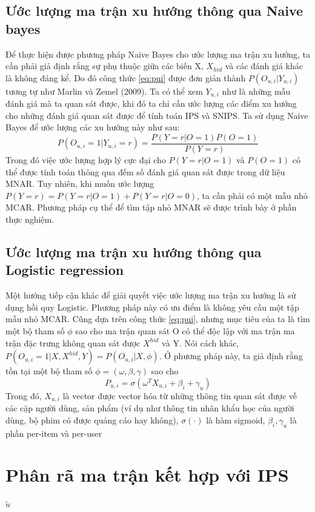 \subsection{Ước lượng ma trận xu hướng thông qua Naive bayes}

Để thực hiện được phương pháp Naive Bayes cho ước lượng ma trận xu hướng, ta cần phải giả định rắng sự phụ thuộc giữa các biến X,   $X_{hid}$ và các đánh giá khác là không đáng kể. Do đó công thức \ref{eq:pui} được đơn giản thành $P(O_{u,i}|Y_{u,i})$ tương tự như Marlin và Zemel (2009). Ta có thể xem $Y_{u,i}$ như là những mẫu đánh giá mà ta quan sát được, khi đó ta chỉ cần ước lượng các điểm xu hướng cho những đánh giá quan sát được để tính toán IPS và SNIPS. Ta sử dụng Naive Bayes để ước lượng các xu hướng này như sau:
\begin{equation}
\label{eq:pnb}
    P(O_{u,i} = 1| Y_{u,i} = r) = \frac{P(Y=r|O=1)P(O=1)}{P(Y=r)}
\end{equation}
Trong đó việc ước lượng hợp lý cực đại cho $P(Y=r|O=1)$ và $P(O=1)$ có thể được tính toán thông qua đếm số đánh giá  quan sát được trong dữ liệu MNAR. Tuy nhiên, khi muốn ước lượng $P(Y=r) = P(Y=r|O=1) + P(Y=r|O=0)$, ta cần phải có một mẫu nhỏ MCAR. Phương pháp cụ thể để tìm tập nhỏ MNAR sẽ được trình bày ở phần thực nghiệm.  

\subsection{Ước lượng ma trận xu hướng thông qua Logistic regression}
Một hướng tiếp cận khác để giải quyết việc  ước lượng ma trận xu hướng là sử dụng hồi quy Logistic. Phương pháp này có ưu điểm là không yêu cầu một tập mẫu nhỏ MCAR. Cũng dựa trên công thức \ref{eq:pui}, nhưng mục tiêu của ta là tìm một bộ tham số $\phi$ sao cho ma trận quan sát O có thể độc lập với ma trận ma
trận đặc trưng không quan sát được $X^{hid}$ và Y. Nói cách khác, $P(O_{u,i} = 1|X, X^{hid},Y) = P(O_{u,i}|X,\phi)$. Ở phương pháp này, ta giả định rằng tồn tại một bộ tham số $\phi=(\omega, \beta, \gamma)$ sao cho
\begin{equation}
    \label{eq:plr}
    P_{u,i} = \sigma(\omega^TX_{u,i} + \beta_i + \gamma_u)
\end{equation}
Trong đó, $X_{u,i}$ là vector được vector hóa từ những thông tin quan sát được về các cặp người dùng, sản phẩm (ví dụ như thông tin nhân khẩu học của người dùng, bộ phim có được quảng cáo hay không), $\sigma(\cdot)$ là hàm sigmoid, $\beta_i, \gamma_u$ là phần per-item và per-user

\section{Phân rã ma trận kết hợp với IPS}
 
 $\tilde{u}$
